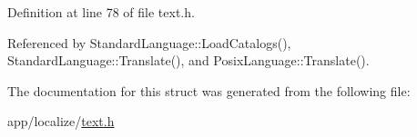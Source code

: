 Definition at line 78 of file text.\+h.



Referenced by Standard\+Language\+::\+Load\+Catalogs(), Standard\+Language\+::\+Translate(), and Posix\+Language\+::\+Translate().



The documentation for this struct was generated from the following file\+:\begin{DoxyCompactItemize}
\item 
app/localize/\hyperlink{text_8h}{text.\+h}\end{DoxyCompactItemize}
